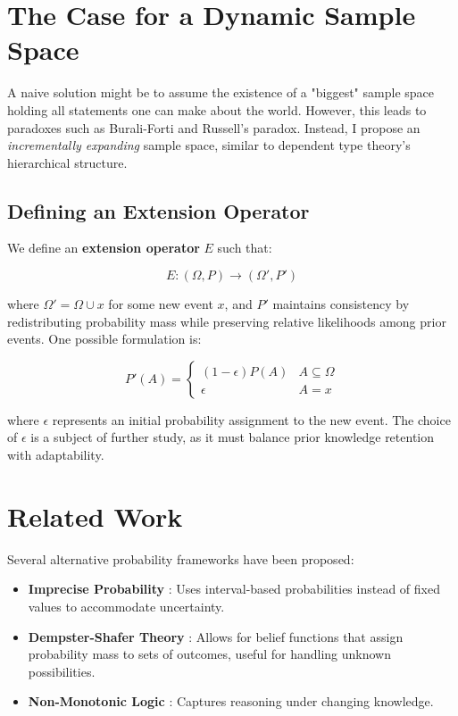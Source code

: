 \documentclass{article}
\begin{document}
\section{The Case for a Dynamic Sample Space}
A naive solution might be to assume the existence of a "biggest" sample space holding all statements one can make about the world. However, this leads to paradoxes such as Burali-Forti and Russell’s paradox. Instead, I propose an \textit{incrementally expanding} sample space, similar to dependent type theory’s hierarchical structure.

\subsection{Defining an Extension Operator}
We define an \textbf{extension operator} $E$ such that:

\begin{equation}
E: (\Omega, P) \rightarrow (\Omega', P')
\end{equation}

where $\Omega' = \Omega \cup {x}$ for some new event $x$, and $P'$ maintains consistency by redistributing probability mass while preserving relative likelihoods among prior events. One possible formulation is:

\begin{equation}
P'(A) = \begin{cases}
(1 - \epsilon) P(A) & A \subseteq \Omega \\
\epsilon & A = {x}
\end{cases}
\end{equation}

where $\epsilon$ represents an initial probability assignment to the new event. The choice of $\epsilon$ is a subject of further study, as it must balance prior knowledge retention with adaptability.

\section{Related Work}
Several alternative probability frameworks have been proposed:

\begin{itemize}
\item \textbf{Imprecise Probability} \cite{walley1991imprecise}: Uses interval-based probabilities instead of fixed values to accommodate uncertainty.
\item \textbf{Dempster-Shafer Theory} \cite{shafer1976mathematical}: Allows for belief functions that assign probability mass to sets of outcomes, useful for handling unknown possibilities.
\item \textbf{Non-Monotonic Logic} \cite{gabbay1994handbook}: Captures reasoning under changing knowledge.
\end{itemize}
\end{document}
